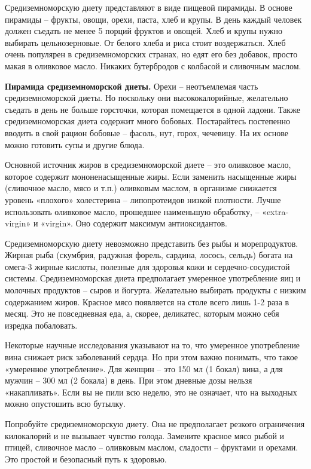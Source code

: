 Средиземноморскую диету представляют в виде пищевой пирамиды. В основе пирамиды – фрукты, овощи, орехи, паста, хлеб и крупы. В день каждый человек должен съедать не менее 5 порций фруктов и овощей. Хлеб и крупы нужно выбирать цельнозерновые. От белого хлеба и риса стоит воздержаться. Хлеб очень популярен в средиземноморских странах, но едят его без добавок, просто макая в оливковое масло. Никаких бутербродов с колбасой и сливочным маслом.

\textbf{Пирамида средиземноморской диеты.} Орехи – неотъемлемая часть средиземноморской диеты. Но поскольку они высококалорийные, желательно съедать в день не больше горсточки, которая помещается в одной ладони. Также средиземноморская диета содержит много бобовых. Постарайтесь постепенно вводить в свой рацион бобовые – фасоль, нут, горох, чечевицу. На их основе можно готовить супы и другие блюда.

Основной источник жиров в средиземноморской диете – это оливковое масло, которое содержит мононенасыщенные жиры. Если заменить насыщенные жиры (сливочное масло, мясо и т.п.) оливковым маслом, в организме снижается уровень «плохого» холестерина – липопротеидов низкой плотности. Лучше использовать оливковое масло, прошедшее наименьшую обработку, – «extra-virgin» и «virgin». Оно содержит максимум антиоксидантов.

Средиземноморскую диету невозможно представить без рыбы и морепродуктов. Жирная рыба (скумбрия, радужная форель, сардина, лосось, сельдь) богата на омега-3 жирные кислоты, полезные для здоровья кожи и сердечно-сосудистой системы. Средиземноморская диета предполагает умеренное употребление яиц и молочных продуктов – сыров и йогурта. Желательно выбирать продукты с низким содержанием жиров. Красное мясо появляется на столе всего лишь 1-2 раза в месяц. Это не повседневная еда, а, скорее, деликатес, которым можно себя изредка побаловать.


Некоторые научные исследования указывают на то, что умеренное употребление вина снижает риск заболеваний сердца. Но при этом важно понимать, что такое «умеренное употребление». Для женщин – это 150 мл (1 бокал) вина, а для мужчин – 300 мл (2 бокала) в день. При этом дневные дозы нельзя «накапливать». Если вы не пили всю неделю, это не означает, что на выходных можно опустошить всю бутылку.

Попробуйте средиземноморскую диету. Она не предполагает резкого ограничения килокалорий и не вызывает чувство голода. Замените красное мясо рыбой и птицей, сливочное масло – оливковым маслом, сладости – фруктами и орехами. Это простой и безопасный путь к здоровью.

